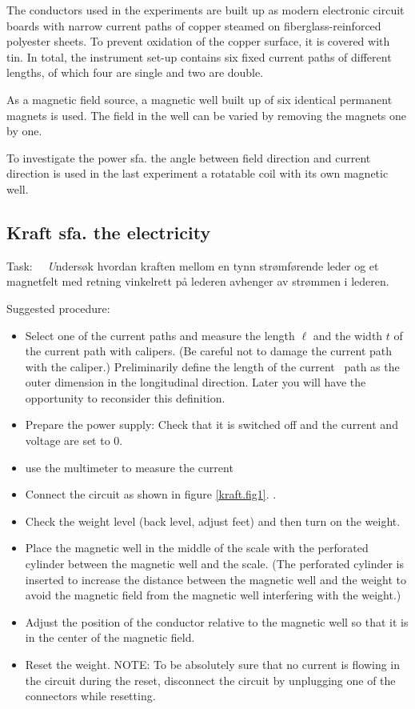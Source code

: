 \documentclass[../Elmag-labhefte-2020.tex]{subfiles}
\begin{document}
The conductors used in the experiments are built up as modern electronic circuit boards with narrow current paths of copper steamed on fiberglass-reinforced polyester sheets. To prevent oxidation of the copper surface, it is covered with tin. In total, the instrument set-up contains six fixed current paths of different lengths, of which four are single and two are double.

As a magnetic field source, a magnetic well built up of six identical permanent magnets is used. The field in the well can be varied by removing the magnets one by one.

To investigate the power sfa. the angle between field direction and current direction is used in the last experiment a rotatable coil with its own magnetic well.



\subsection{Kraft sfa. the electricity}

Task: \ \
{\emph Undersøk hvordan kraften mellom en tynn strømførende leder og et magnetfelt med retning vinkelrett på lederen avhenger av strømmen i lederen.}

Suggested procedure:
%
\vspace{-4mm}
\begin{itemize}
    \item Select one of the current paths and measure the length $\ell$ and the width $t$ of the current path with calipers. (Be careful not to damage the current path with the caliper.) Preliminarily define the length of the current \ path as the outer dimension in the longitudinal direction. %
    Later you will have the opportunity to reconsider this definition.
     
    \item Prepare the power supply: Check that it is switched off and the current and voltage are set to 0.
    \item use the multimeter to measure the current
    \item Connect the circuit as shown in figure \ref{kraft.fig1}. .
    \item Check the weight level (back level, adjust feet) and then turn on the weight.
    \item Place the magnetic well in the middle of the scale with the perforated cylinder between the magnetic well and the scale. %
    (The perforated cylinder is inserted to increase the distance between the magnetic well and the weight to avoid the magnetic field from the magnetic well interfering with the weight.)
    \item Adjust the position of the conductor relative to the magnetic well so that it is in the center of the magnetic field.
    \item Reset the weight.
    NOTE: To be absolutely sure that no current is flowing in the circuit during the reset, disconnect the circuit by unplugging one of the connectors while resetting.
    \end{itemize}
    
\end{document}
